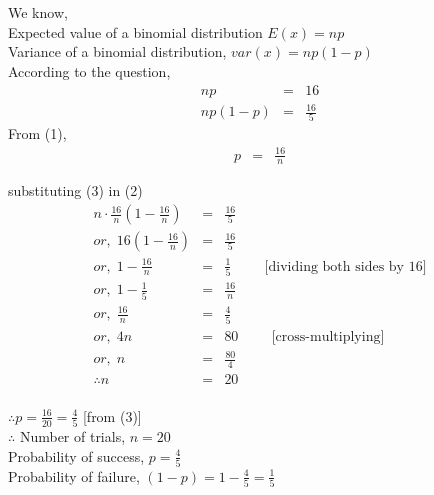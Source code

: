 \documentclass{article}
\begin{document}
\section{}
\Large{
    We know,\\
    Expected value of a binomial distribution $E(x)=np$\\
    Variance of a binomial distribution, $var(x) = np(1-p)$\\
    According to the question,
    \begin{eqnarray}
        np &=& 16\\
        np(1-p) &=& \frac{16}{5}
    \end{eqnarray}
    From (1),
    \begin{eqnarray}
        p &=& \frac{16}{n}
    \end{eqnarray}

    substituting (3) in (2)
    \begin{eqnarray*}
        n\cdot\frac{16}{n} \left(1-\frac{16}{n}\right) &=& \frac{16}{5}\\
        or,\; 16\left(1-\frac{16}{n}\right) &=& \frac{16}{5}\\
        or,\; 1-\frac{16}{n} &=& \frac{1}{5}\hspace{1cm}\text{[dividing both sides by 16]}\\
        or,\; 1-\frac{1}{5} &=& \frac{16}{n}\\
        or,\; \frac{16}{n} &=& \frac{4}{5}\\
        or,\; 4n &=& 80 \hspace{1cm}\text{[cross-multiplying]}\\
        or,\; n &=& \frac{80}{4}\\
        \therefore n &=& 20
    \end{eqnarray*}
    \\
    $\therefore p = \frac{16}{20} = \frac{4}{5}$ \hspace{1cm}[from (3)]\\

    $\therefore$ Number of trials, $n = 20$\\

    Probability of success, $p = \frac{4}{5}$\\

    Probability of failure, $(1-p) = 1-\frac{4}{5}=\frac{1}{5}$

}
\newpage
\end{document}

